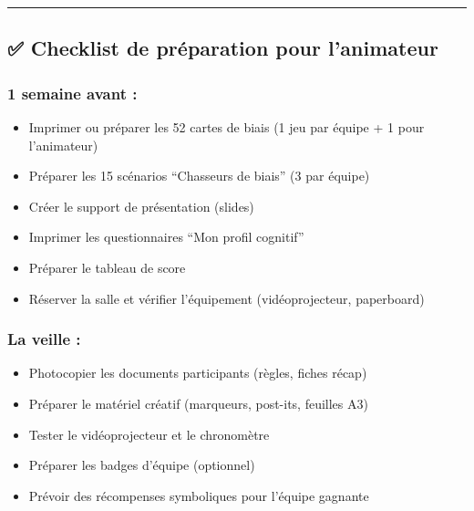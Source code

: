 \documentclass[
]{article}
\providecommand{\tightlist}{%
  \setlength{\itemsep}{0pt}\setlength{\parskip}{0pt}}
\begin{document}
\begin{center}\rule{0.5\linewidth}{0.5pt}\end{center}

\subsection{✅ Checklist de préparation pour
l'animateur}\label{checklist-de-pruxe9paration-pour-lanimateur}

\subsubsection{\texorpdfstring{\textbf{1 semaine avant
:}}{1 semaine avant :}}\label{semaine-avant}

\begin{itemize}
\tightlist
\item[$\square$]
  Imprimer ou préparer les 52 cartes de biais (1 jeu par équipe + 1 pour
  l'animateur)
\item[$\square$]
  Préparer les 15 scénarios ``Chasseurs de biais'' (3 par équipe)
\item[$\square$]
  Créer le support de présentation (slides)
\item[$\square$]
  Imprimer les questionnaires ``Mon profil cognitif''
\item[$\square$]
  Préparer le tableau de score
\item[$\square$]
  Réserver la salle et vérifier l'équipement (vidéoprojecteur,
  paperboard)
\end{itemize}

\subsubsection{\texorpdfstring{\textbf{La veille
:}}{La veille :}}\label{la-veille}

\begin{itemize}
\tightlist
\item[$\square$]
  Photocopier les documents participants (règles, fiches récap)
\item[$\square$]
  Préparer le matériel créatif (marqueurs, post-its, feuilles A3)
\item[$\square$]
  Tester le vidéoprojecteur et le chronomètre
\item[$\square$]
  Préparer les badges d'équipe (optionnel)
\item[$\square$]
  Prévoir des récompenses symboliques pour l'équipe gagnante
\end{itemize}
\end{document}
